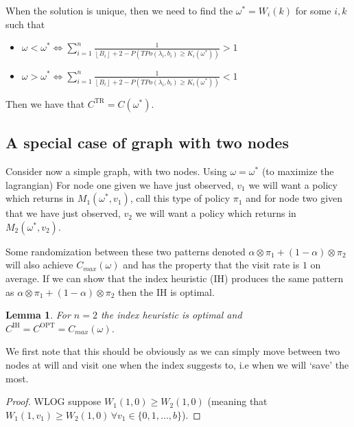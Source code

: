 \documentclass[a4paper,10pt]{article}
\newcommand{\floor}[1]{\left \lfloor #1 \right \rfloor}
\newtheorem{lemma}[theorem]{Lemma}
\theoremstyle{definition}
\theoremstyle{definition}
\theoremstyle{remark}
\theoremstyle{definition}
\begin{document}
When the solution is unique, then we need to find the $\omega^{*}=W_{i}(k)$ for some $i,k$ such that
\begin{itemize}
\item $\omega<\omega^{*} \iff \sum\limits_{i=1}^{n} \frac{1}{\floor{B_{i}}+2-P(TPo(\lambda_{i},b_{i}) \geq K_{i}(\omega^{*}))} > 1$
\item $\omega>\omega^{*} \iff \sum\limits_{i=1}^{n} \frac{1}{\floor{B_{i}}+2-P(TPo(\lambda_{i},b_{i}) \geq K_{i}(\omega^{*}))} < 1$
\end{itemize}

Then we have that $C^{\text{TR}}=C(\omega^{*})$.

\subsection{A special case of graph with two nodes}
Consider now a simple graph, with two nodes. Using $\omega=\omega^{*}$ (to maximize the lagrangian) For node one given we have just observed, $v_{1}$ we will want a policy which returns in $M_{1}(\omega^{*},v_{1})$, call this type of policy $\pi_{1}$ and for node two given that we have just observed, $v_{2}$ we will want a policy which returns in $M_{2}(\omega^{*},v_{2})$.

Some randomization between these two patterns denoted $\alpha \otimes \pi_{1} + (1-\alpha) \otimes \pi_{2}$ will also achieve $C_{max}(\omega)$ and has the property that the visit rate is $1$ on average. If we can show that the index heuristic (IH) produces the same pattern as $\alpha \otimes \pi_{1} + (1-\alpha) \otimes \pi_{2}$ then the IH is optimal.

\begin{lemma}
For $n=2$ the index heuristic is optimal and $C^{\text{IH}}=C^{\text{OPT}}=C_{max}(\omega)$.
\end{lemma}

We first note that this should be obviously as we can simply move between two nodes at will and visit one when the index suggests to, i.e when we will `save' the most.

\begin{proof}
WLOG suppose $W_{1}(1,0) \geq W_{2}(1,0)$ (meaning that $W_{1}(1,v_{1}) \geq W_{2}(1,0) \, \forall v_{1} \in \{0,1,...,b \}$).
\end{proof}
\end{document}
